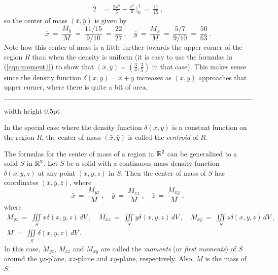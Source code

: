 \begin{exmp}
\begin{alignat*}{2}
  &=~ \frac{2x^5}{5} + \frac{x^6}{3} \,\Bigg|_0^1 ~=~ \frac{11}{15} ~,
 \end{alignat*}
 so the center of mass $(\bar{x},\bar{y})$ is given by
 \begin{displaymath}
  \bar{x} ~=~ \frac{M_y}{M} ~=~ \frac{11/15}{9/10} ~=~ \frac{22}{27} ~, \quad
  \bar{y} ~=~ \frac{M_x}{M} ~=~ \frac{5/7}{9/10} ~=~ \frac{50}{63} ~.
 \end{displaymath}
 Note how this center of mass is a little further towards the upper corner of the region $R$ than when the density is
 uniform (it is easy to use the formulas in (\ref{eqn:moment1}) to show that $(\bar{x},\bar{y}) =
 \left( \frac{3}{4},\frac{3}{5} \right)$ in that case). This makes sense since the density
 function $\delta(x,y) = x+y$ increases as $(x,y)$ approaches that upper corner, where there is quite a bit of area.
\end{exmp}
\hrule width \textwidth height 0.5pt
\vspace{3mm}

In the special case where the density function $\delta(x,y)$ is a constant function on the region $R$, the center of
mass $(\bar{x},\bar{y})$ is called the \emph{centroid} of $R$.

The formulas for the center of mass of a region in $\mathbb{R}^{2}$ can be generalized to a solid $S$ in $\mathbb{R}^{3}$.
Let $S$ be a solid with a continuous mass density function $\delta(x,y,z)$ at any point $(x,y,z)$ in $S$. Then the
center of mass of $S$ has coordinates $(\bar{x},\bar{y},\bar{z})$, where
\begin{equation}\label{eqn:center3}
 \bar{x} ~=~ \frac{M_{yz}}{M} ~,\quad \bar{y} ~=~ \frac{M_{xz}}{M} ~,\quad \bar{z} ~=~ \frac{M_{xy}}{M} ~,
\end{equation}
where
\begin{gather}\label{eqn:moment3}
 M_{yz} ~=~ \iiint\limits_{S} x\delta(x,y,z)\,dV ~, \quad M_{xz} ~=~ \iiint\limits_{S} y\delta(x,y,z)\,dV ~, \quad
 M_{xy} ~=~ \iiint\limits_{S} z\delta(x,y,z)\,dV ~,\\M ~=~ \iiint\limits_{S} \delta(x,y,z)\,dV ~.
\end{gather}
In this case, $M_{yz}$, $M_{xz}$ and $M_{xy}$ are called the \emph{moments} (or \emph{first moments}) of $S$
around the $yz$-plane, $xz$-plane and $xy$-plane, respectively. Also, $M$ is the mass of $S$.

